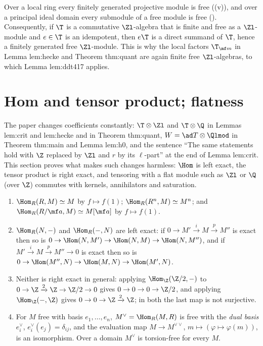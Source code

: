 \begin{remark}\label{rem:modules:projective-free}
Over a local ring every finitely generated projective module is free ((v)), and over a principal
ideal domain every submodule of a free module is free (). Consequently, if $\T$ is a
commutative $\Zl$-algebra that is finite and free as a $\Zl$-module and $e\in\T$ is an idempotent, then $e\T$ is a direct
summand of $\T$, hence a finitely generated free $\Zl$-module. This is why the local factors $\T_{\mf m}$ in Lemma lem:hecke and
Theorem thm:quant are again finite free $\Zl$-algebras, to which Lemma lem:ddt417 applies.
\end{remark}

\section{Hom and tensor product; flatness}\label{sec:modules:tensor}

The paper changes coefficients constantly: $\T\otimes\Zl$ and $\T\otimes\Q$ in Lemmas lem:crit and lem:hecke and in Theorem
thm:quant, $W=\ad T\otimes\Qlmod$ in Theorem thm:main and Lemma lem:h0, and the sentence ``The same statements hold with $\Z$
replaced by $\Zl$ and $r$ by its $\ell$-part'' at the end of Lemma lem:crit. This section proves what makes such changes harmless: $\Hom$ is left exact,
the tensor product is right exact, and tensoring with a flat module such as $\Zl$ or $\Q$ (over $\Z$) commutes with kernels,
annihilators and saturation.

\begin{proposition}[Hom]\label{prop:modules:hom}
\begin{enumerate}[label=(\roman*)]
\item $\Hom_R(R,M)\simeq M$ by $f\mapsto f(1)$; $\Hom_R(R^n,M)\simeq M^n$; and $\Hom_R(R/\mf a,M)\simeq M[\mf a]$ by $f\mapsto f(1)$.
\item $\Hom_R(N,-)$ and $\Hom_R(-,N)$ are left exact: if $0\to M'\xrightarrow{i}M\xrightarrow{p}M''$ is exact then so is
$0\to\Hom(N,M')\to\Hom(N,M)\to\Hom(N,M'')$, and if $M'\xrightarrow{i}M\xrightarrow{p}M''\to0$ is exact then so is
$0\to\Hom(M'',N)\to\Hom(M,N)\to\Hom(M',N)$.
\item Neither is right exact in general: applying $\Hom_\Z(\Z/2,-)$ to $0\to\Z\xrightarrow{2}\Z\to\Z/2\to0$ gives $0\to0\to0\to\Z/2$, and
applying $\Hom_\Z(-,\Z)$ gives $0\to0\to\Z\xrightarrow{2}\Z$; in both the last map is not surjective.
\item For $M$ free with basis $e_1,\dots,e_n$, $M^\vee=\Hom_R(M,R)$ is free with the \emph{dual basis} $e_i^\vee$,
$e_i^\vee(e_j)=\delta_{ij}$, and the evaluation map $M\to M^{\vee\vee}$, $m\mapsto(\varphi\mapsto\varphi(m))$, is an isomorphism. Over a
domain $M^\vee$ is torsion-free for every $M$.
\end{enumerate}
\end{proposition}

